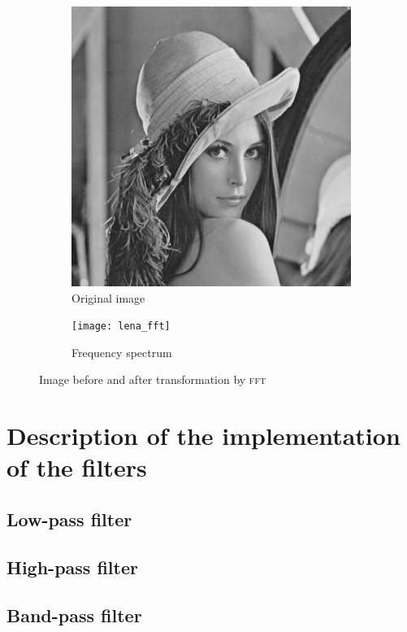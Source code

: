 \documentclass[12pt]{article}
\newcommand*{\fft}{\textsc{fft}}
\begin{document}
\begin{figure}[H]\centering
    \begin{subfigure}[ht]{.4\textwidth}\centering
        \includegraphics[width=\textwidth]{lena}
        \caption{Original image}
    \end{subfigure}
    \hspace*{2em}
    \begin{subfigure}[ht]{.4\textwidth}\centering
        \texttt{[image: lena\_fft]}
        \caption{Frequency spectrum}
    \end{subfigure}
    \caption{Image before and after transformation by \fft}
\end{figure}

\section{Description of the implementation of the filters}
\subsection{Low-pass filter}
\subsection{High-pass filter}
\subsection{Band-pass filter}
\end{document}
